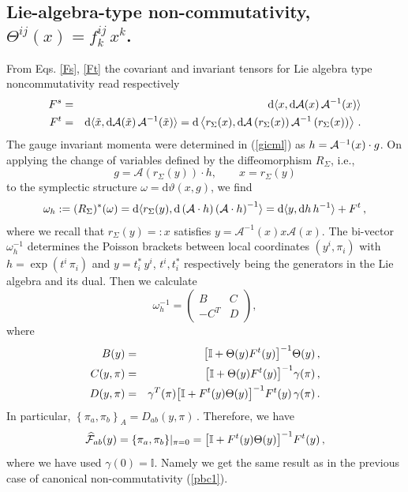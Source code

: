 \documentclass[12pt,a4paper]{article}
\numberwithin{equation}{section}
\theoremstyle{definition}
\newcommand{\dd}{\mathrm{d}}
\newcommand{\be}{\begin{equation}}
\newcommand{\ee}{\end{equation}}
\newcommand{\bea}{\begin{eqnarray}}
\newcommand{\eea}{\end{eqnarray}}
\newcommand{\eqn}{\eqref}
\begin{document}
\subsection{Lie-algebra-type non-commutativity, \texorpdfstring{$\Theta^{ij}(x)=f^{ij}_k\,x^k$}{}.}
From Eqs. \eqn{Fs}, \eqn{Ft} the covariant and invariant tensors for Lie algebra type noncommutativity read respectively
\bea
F^s &=&\dd\langle x,\dd{\cal A}(x)\,{\cal A}^{-1}(x)\rangle\\
F^t &=& \dd\langle\tilde x,\dd{\cal A}(\tilde x)\,{\cal A}^{-1}(\tilde x)\rangle=\dd\left\langle r_\Sigma(x),\dd{\cal A}\left(r_\Sigma(x)\right){\cal A}^{-1}\left(r_\Sigma(x)\right)\right\rangle\,.
\eea
The gauge invariant momenta were determined in (\ref{gicml})  as $h={\cal A}^{-1}(x)\cdot g$. On applying the change of variables defined by the diffeomorphism $R_{\Sigma}$, i.e.,
\be
g=\mathcal{A}(r_{\Sigma}(y))\cdot h ,\qquad x = r_{\Sigma}(y)
\ee
to the symplectic structure $\omega=\dd\vartheta(x,g)$, we find
\begin{eqnarray}
 \omega_h:=(R_{\Sigma})^*(\omega) = \dd\langle r_{\Sigma}(y), \dd \left({\cal A}\cdot h\right)\left({\cal A}\cdot h\right)^{-1}\rangle=\dd\langle y,\dd h\,h^{-1}\rangle+ F^t \,,
\end{eqnarray}
where we recall that $r_{\Sigma}(y) =: x$ satisfies $y = \mathcal{A}^{-1}(x)x\mathcal{A}(x)$. The bi-vector $\omega_h^{-1}$ determines the Poisson brackets between local coordinates $(y^i,\pi_i)$ with $h=\exp(t^i\,\pi_i)$ and $y=t^\ast_i\,y^i$, $t^i, t^\ast_i$ respectively being the generators in the Lie algebra and its dual. Then we calculate
\begin{equation}\label{inomega}
\omega_h^{-1 }=  \left(
\begin{array}{cc}
B & C \\
-C^T &D
\end{array}
\right),
\end{equation}
where
\begin{eqnarray}
B(y)&=&  \big[\mathbb{I}+\Theta(y)F^t(y)\big]^{-1}\Theta(y) \,,\\
C(y,\pi)&=&  \big[\mathbb{I}+\Theta(y) F^t(y)\big]^{-1}\gamma(\pi)\,,\notag\\
D(y,\pi)&=& \gamma^T(\pi) \big[\mathbb{I} +  F^t(y)\Theta(y)\big]^{-1}F^t(y)\, \gamma(\pi)\,.\notag
\end{eqnarray}
In particular,
$
\left\{\pi_a,\pi_b\right\}_A=D_{ab}(y,\pi)\,. 
$ Therefore, we have 
\begin{equation}\label{calFFs}
\widehat{{\cal F}}_{ab}(y)=\{\pi_a,\pi_b\}|_{\pi=0}= \big[\mathbb{I} +  F^t(y)\Theta(y)\big]^{-1}F^t(y)\,,
\end{equation}
where we have used  $\gamma(0)=\mathbb{I}$. Namely we get the same result as in the previous case of  canonical non-commutativity (\ref{pbc1}).
\end{document}
